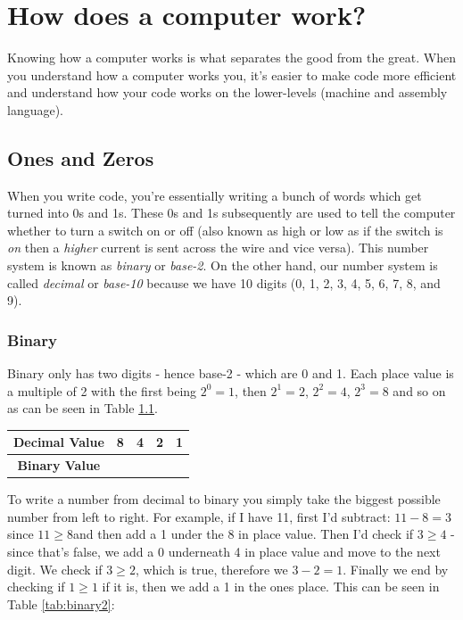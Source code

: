 \documentclass[12pt,a4paper]{book}
\begin{document}
	\chapter{How does a computer work?}  \label{chap:computers}
		Knowing how a computer works is what separates the good from the great. When you understand how a computer works you, it's easier to make code more efficient and understand how your code works on the lower-levels (machine and assembly language).
		\section{Ones and Zeros}
			When you write code, you're essentially writing a bunch of words which get turned into 0s and 1s. These 0s and 1s subsequently are used to tell the computer whether to turn a switch on or off (also known as high or low as if the switch is \textit{on} then a \textit{higher} current is sent across the wire and vice versa). This number system is known as \textit{binary} or \textit{base-2}. On the other hand, our number system is called \textit{decimal} or \textit{base-10} because we have 10 digits (0, 1, 2, 3, 4, 5, 6, 7, 8, and 9).
			\subsection{Binary}
				Binary only has two digits - hence base-2 - which are 0 and 1. Each place value is a multiple of 2 with the first being $2^{0}=1$, then $2^{1}=2$, $2^{2}=4$, $2^{3}=8$ and so on as can be seen in Table \ref{tab:binary1}.
				\begin{table}[H]
					\centering
					\label{tab:binary1}
					\begin{tabular}{c||c|c|c|c|}
						\textbf{Decimal Value} & 8 & 4 & 2 & 1 \\
						\hline
						\textbf{Binary Value} & & & & 
					\end{tabular}
				\end{table}	
				To write a number from decimal to binary you simply take the biggest possible number from left to right. For example, if I have 11, first I'd subtract: $11-8=3$ since $11\geq8$and then add a 1 under the 8 in place value. Then I'd check if $3\geq4$ - since that's false, we add a 0 underneath 4 in place value and move to the next digit. We check if $3\geq2$, which is true, therefore we $3-2=1$. Finally we end by checking if $1\geq1$ if it is, then we add a 1 in the ones place. This can be seen in Table \ref{tab:binary2}:
				
\end{document}
